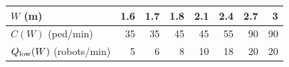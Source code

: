 \begin{tabular}{lrrrrrrr}
\toprule
$W$ (m) & 1.6 & 1.7 & 1.8 & 2.1 & 2.4 & 2.7 & 3 \\
\midrule
$C(W)$ (ped/min) & 35 & 35 & 45 & 45 & 55 & 90 & 90 \\
$Q_{\rm low}(W)$ (robots/min) & 5 & 6 & 8 & 10 & 18 & 20 & 20 \\
\bottomrule
\end{tabular}
